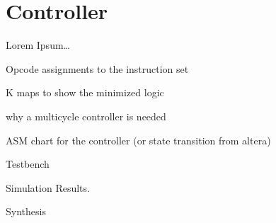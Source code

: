 

\section{Controller}
Lorem Ipsum\dots

Opcode assignments to the instruction set

K maps to show the minimized logic

why a multicycle controller is needed

ASM chart for the controller (or state transition from altera)

Testbench

Simulation Results. 

Synthesis
